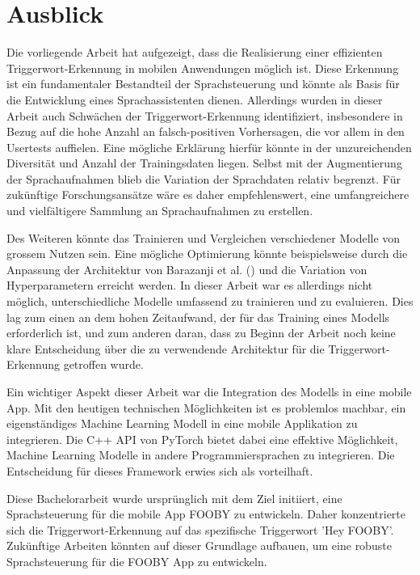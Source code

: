\documentclass[11pt,a4paper]{article}
\begin{document}
\section{Ausblick}
Die vorliegende Arbeit hat aufgezeigt, dass die Realisierung einer effizienten Triggerwort-Erkennung 
in mobilen Anwendungen möglich ist. Diese Erkennung ist ein fundamentaler Bestandteil der 
Sprachsteuerung und könnte als Basis für die Entwicklung eines Sprachassistenten dienen. Allerdings 
wurden in dieser Arbeit auch Schwächen der Triggerwort-Erkennung identifiziert, insbesondere in 
Bezug auf die hohe Anzahl an falsch-positiven Vorhersagen, die vor allem in den Usertests auffielen. 
Eine mögliche Erklärung hierfür könnte in der unzureichenden Diversität und Anzahl der Trainingsdaten 
liegen. Selbst mit der Augmentierung der Sprachaufnahmen blieb die Variation der Sprachdaten relativ 
begrenzt. Für zukünftige Forschungsansätze wäre es daher empfehlenswert, eine umfangreichere und 
vielfältigere Sammlung an Sprachaufnahmen zu erstellen.

\noindent \newline
Des Weiteren könnte das Trainieren und Vergleichen verschiedener Modelle von grossem Nutzen sein. 
Eine mögliche Optimierung könnte beispielsweise durch die Anpassung der Architektur von Barazanji 
et al. (\cite{barazanji2023heyditto}) und die Variation von Hyperparametern erreicht werden. In 
dieser Arbeit war es allerdings nicht möglich, unterschiedliche Modelle umfassend zu trainieren und 
zu evaluieren. Dies lag zum einen an dem hohen Zeitaufwand, der für das Training eines Modells 
erforderlich ist, und zum anderen daran, dass zu Beginn der Arbeit noch keine klare Entscheidung 
über die zu verwendende Architektur für die Triggerwort-Erkennung getroffen wurde.

\noindent \newline
Ein wichtiger Aspekt dieser Arbeit war die Integration des Modells in eine mobile App. Mit den 
heutigen technischen Möglichkeiten ist es problemlos machbar, ein eigenständiges Machine Learning 
Modell in eine mobile Applikation zu integrieren. Die C++ API von PyTorch bietet dabei eine 
effektive Möglichkeit, Machine Learning Modelle in andere Programmiersprachen zu integrieren. Die 
Entscheidung für dieses Framework erwies sich als vorteilhaft.

\noindent \newline
Diese Bachelorarbeit wurde ursprünglich mit dem Ziel initiiert, eine Sprachsteuerung für die mobile 
App FOOBY zu entwickeln. Daher konzentrierte sich die Triggerwort-Erkennung auf das spezifische 
Triggerwort 'Hey FOOBY'. Zukünftige Arbeiten könnten auf dieser Grundlage aufbauen, um eine robuste 
Sprachsteuerung für die FOOBY App zu entwickeln.
\end{document}
